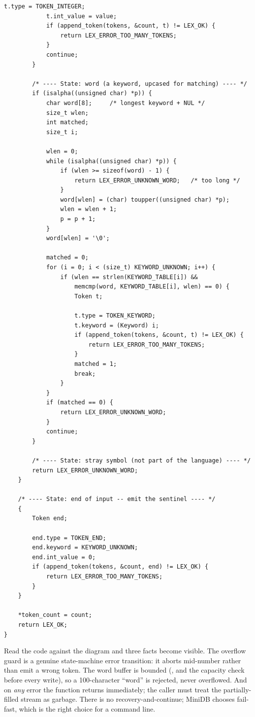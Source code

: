 \begin{lstlisting}[caption={The MiniDB lexer (condensed from lexer.c).}]
            t.type = TOKEN_INTEGER;
            t.int_value = value;
            if (append_token(tokens, &count, t) != LEX_OK) {
                return LEX_ERROR_TOO_MANY_TOKENS;
            }
            continue;
        }

        /* ---- State: word (a keyword, upcased for matching) ---- */
        if (isalpha((unsigned char) *p)) {
            char word[8];     /* longest keyword + NUL */
            size_t wlen;
            int matched;
            size_t i;

            wlen = 0;
            while (isalpha((unsigned char) *p)) {
                if (wlen >= sizeof(word) - 1) {
                    return LEX_ERROR_UNKNOWN_WORD;   /* too long */
                }
                word[wlen] = (char) toupper((unsigned char) *p);
                wlen = wlen + 1;
                p = p + 1;
            }
            word[wlen] = '\0';

            matched = 0;
            for (i = 0; i < (size_t) KEYWORD_UNKNOWN; i++) {
                if (wlen == strlen(KEYWORD_TABLE[i]) &&
                    memcmp(word, KEYWORD_TABLE[i], wlen) == 0) {
                    Token t;

                    t.type = TOKEN_KEYWORD;
                    t.keyword = (Keyword) i;
                    if (append_token(tokens, &count, t) != LEX_OK) {
                        return LEX_ERROR_TOO_MANY_TOKENS;
                    }
                    matched = 1;
                    break;
                }
            }
            if (matched == 0) {
                return LEX_ERROR_UNKNOWN_WORD;
            }
            continue;
        }

        /* ---- State: stray symbol (not part of the language) ---- */
        return LEX_ERROR_UNKNOWN_WORD;
    }

    /* ---- State: end of input -- emit the sentinel ---- */
    {
        Token end;

        end.type = TOKEN_END;
        end.keyword = KEYWORD_UNKNOWN;
        end.int_value = 0;
        if (append_token(tokens, &count, end) != LEX_OK) {
            return LEX_ERROR_TOO_MANY_TOKENS;
        }
    }

    *token_count = count;
    return LEX_OK;
}
\end{lstlisting}

Read the code against the diagram and three facts become visible. The
overflow guard is a genuine state-machine error transition: it aborts
mid-number rather than emit a wrong token. The word buffer is bounded
(, and the capacity check before every write), so a
100-character ``word'' is rejected, never overflowed. And on \emph{any}
error the function returns immediately; the caller must treat the
partially-filled stream as garbage. There is no recovery-and-continue;
MiniDB chooses fail-fast, which is the right choice for a command
line.


